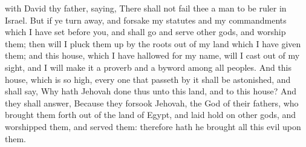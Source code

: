 with David thy father, saying, There shall not fail thee a man to be ruler in Israel.  But if ye turn away, and forsake my statutes and my commandments which I have set before you, and shall go and serve other gods, and worship them; then will I pluck them up by the roots out of my land which I have given them; and this house, which I have hallowed for my name, will I cast out of my sight, and I will make it a proverb and a byword among all peoples. And this house, which is so high, every one that passeth by it shall be astonished, and shall say, Why hath Jehovah done thus unto this land, and to this house? And they shall answer, Because they forsook Jehovah, the God of their fathers, who brought them forth out of the land of Egypt, and laid hold on other gods, and worshipped them, and served them: therefore hath he brought all this evil upon them. 

